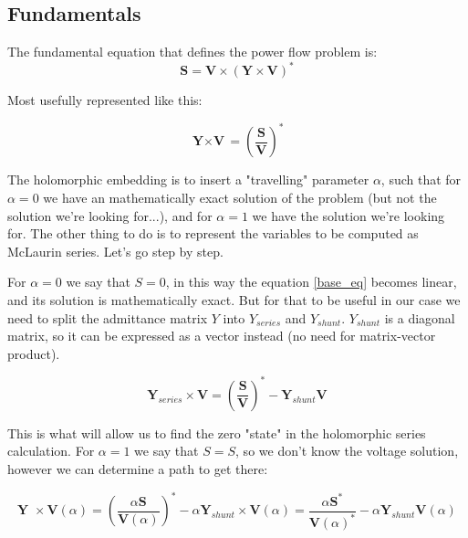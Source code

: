 \documentclass[11pt,fleqn]{book} %
\begin{document}
\subsection{Fundamentals} \label{helm_fundamentals}

The fundamental equation that defines the power flow problem is:
\begin{equation}
\textbf{S} = \textbf{V} \times (\textbf{Y} \times \textbf{V})^*
\end{equation}

Most usefully represented like this:


\begin{equation}
{\textbf{Y} \times \textbf{V}} = \left(\frac{\textbf{S}}{\textbf{V}}\right)^* 
\label{base_eq}
\end{equation}


The holomorphic embedding is to insert a "travelling" parameter $\alpha$, such that for $\alpha=0$ we have an mathematically exact solution of the problem (but not the solution we're looking for...), and for $\alpha=1$ we have the solution we're looking for. The other thing to do is to represent the variables to be computed as McLaurin series. Let's go step by step.\newline

For $\alpha=0$ we say that $S=0$, in this way the equation \ref{base_eq} becomes linear, and its solution is mathematically exact. But for that to be useful in our case we need to split the admittance matrix $Y$ into $Y_{series}$ and $Y_{shunt}$. $Y_{shunt}$ is a diagonal matrix, so it can be expressed as a vector instead (no need for matrix-vector product).

\begin{equation}
\textbf{Y}_{series} \times \textbf{V} = \left(\frac{\textbf{S}}{\textbf{V}}\right)^* - \textbf{Y}_{shunt} \textbf{V}
\label{base_eq_alpha_0}
\end{equation}

This is what will allow us to find the zero "state" in the holomorphic series calculation. For $\alpha=1$ we say that $S=S$, so we don't know the voltage solution, however we can determine a path to get there:

\begin{equation}
{\textbf{Y }\times \textbf{V}( \alpha )} = \left(\frac{ \alpha\textbf{S}}{\textbf{V}( \alpha )}\right)^* - \alpha \textbf{Y}_{shunt} \times \textbf{V}( \alpha ) = \frac{ \alpha\textbf{S}^*}{\textbf{V}( \alpha )^*} - \alpha \textbf{Y}_{shunt} \textbf{V}( \alpha )
\label{base_eq_embedded}
\end{equation}
\end{document}
